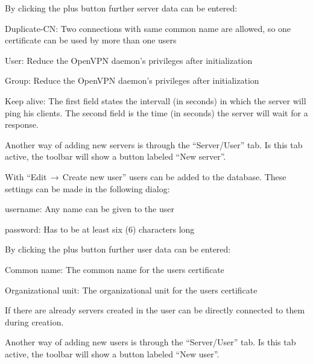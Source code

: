 \nl By clicking the plus button further server data can be entered:

\begin{items}
	\item Duplicate-CN: Two connections with same common name are allowed, so
	one certificate can be used by more than one users
	\item User: Reduce the OpenVPN daemon's privileges after initialization
	\item Group: Reduce the OpenVPN daemon's privileges after initialization
	\item Keep alive: The first field states the intervall (in seconds) in
	which the server will ping his clients. The second field is the time
	(in seconds) the server will wait for a response.
\end{items}




\nl Another way of adding new servers is through the ``Server/User'' tab. Is
this tab active, the toolbar will show a button labeled ``New server''.



\nl With ``Edit$\,\rightarrow\,$Create new user'' users can be added to the
database. These settings can be made in the following dialog:

\begin{items}
    \item username: Any name can be given to the user
    \item password: Has to be at least six (6) characters long
\end{items}

\nl By clicking the plus button further user data can be entered:

\begin{items}
    \item Common name: The common name for the users certificate
    \item Organizational unit: The organizational unit for the users
certificate
\end{items}

\nl If there are already servers created in \Nbm{} the user can be directly
connected to them during creation.

\nl Another way of adding new users is through the ``Server/User'' tab. Is
this tab active, the toolbar will show a button labeled ``New user''.


